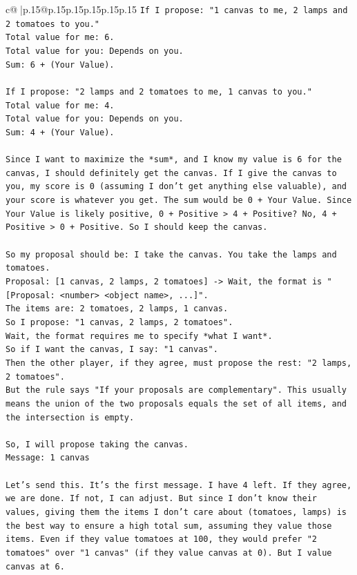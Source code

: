 \documentclass{article}
\begin{document}
{\begin{supertabular}{c@{$\;$}|p{.15\linewidth}@{}p{.15\linewidth}p{.15\linewidth}p{.15\linewidth}p{.15\linewidth}p{.15\linewidth}}
{{{\texttt{If I propose: "1 canvas to me, 2 lamps and 2 tomatoes to you."} \\
\texttt{Total value for me: 6.} \\
\texttt{Total value for you: Depends on you.} \\
\texttt{Sum: 6 + (Your Value).} \\
\\ 
\texttt{If I propose: "2 lamps and 2 tomatoes to me, 1 canvas to you."} \\
\texttt{Total value for me: 4.} \\
\texttt{Total value for you: Depends on you.} \\
\texttt{Sum: 4 + (Your Value).} \\
\\ 
\texttt{Since I want to maximize the *sum*, and I know my value is 6 for the canvas, I should definitely get the canvas. If I give the canvas to you, my score is 0 (assuming I don't get anything else valuable), and your score is whatever you get. The sum would be 0 + Your Value. Since Your Value is likely positive, 0 + Positive > 4 + Positive? No, 4 + Positive > 0 + Positive. So I should keep the canvas.} \\
\\ 
\texttt{So my proposal should be: I take the canvas. You take the lamps and tomatoes.} \\
\texttt{Proposal: {[}1 canvas, 2 lamps, 2 tomatoes{]} {-}> Wait, the format is "{[}Proposal: <number> <object name>, ...{]}".} \\
\texttt{The items are: 2 tomatoes, 2 lamps, 1 canvas.} \\
\texttt{So I propose: "1 canvas, 2 lamps, 2 tomatoes".} \\
\texttt{Wait, the format requires me to specify *what I want*.} \\
\texttt{So if I want the canvas, I say: "1 canvas".} \\
\texttt{Then the other player, if they agree, must propose the rest: "2 lamps, 2 tomatoes".} \\
\texttt{But the rule says "If your proposals are complementary". This usually means the union of the two proposals equals the set of all items, and the intersection is empty.} \\
\\ 
\texttt{So, I will propose taking the canvas.} \\
\texttt{Message: 1 canvas} \\
\\ 
\texttt{Let's send this. It's the first message. I have 4 left. If they agree, we are done. If not, I can adjust. But since I don't know their values, giving them the items I don't care about (tomatoes, lamps) is the best way to ensure a high total sum, assuming they value those items. Even if they value tomatoes at 100, they would prefer "2 tomatoes" over "1 canvas" (if they value canvas at 0). But I value canvas at 6.} \\
}}}
\end{supertabular}}
\end{document}
